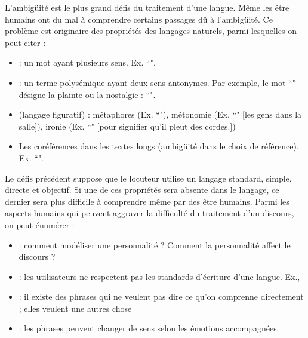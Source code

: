 \documentclass{KodeBook}
\begin{document}
L'ambigüité est le plus grand défis du traitement d'une langue. 
Même les être humains ont du mal à comprendre certains passages dû à l'ambigüité.
Ce problème est originaire des propriétés des langages naturels, parmi lesquelles on peut citer :
\begin{itemize}
	\item {} : un mot ayant plusieurs sens. Ex. ``".
	\item {} : un terme polysémique ayant deux sens antonymes. Par exemple, le mot ``" désigne la plainte ou la nostalgie : ``".
	\item {} (langage figuratif) : métaphores (Ex. ``"), métonomie (Ex. ``" [les gens dans la salle]), ironie (Ex. ``" [pour signifier qu'il pleut des cordes.])
	\item Les coréférences dans les textes longs (ambigüité dans le choix de référence). 
	Ex. ``".
\end{itemize}

Le défis précédent suppose que le locuteur utilise un langage standard, simple, directe et objectif.
Si une de ces propriétés sera absente dans le langage, ce dernier sera plus difficile à comprendre même par des être humains.
Parmi les aspects humains qui peuvent aggraver la difficulté du traitement d'un discours, on peut énumérer :
\begin{itemize}
	\item {} : comment modéliser une personnalité ? Comment la personnalité affect le discours ?
	\item {} : les utilisateurs ne respectent pas les standards d'écriture d'une langue. Ex., 
	\item {} : il existe des phrases qui ne veulent pas dire ce qu'on comprenne directement ; elles veulent une autres chose
	\item {} : les phrases peuvent changer de sens selon les émotions accompagnées
\end{itemize}
\end{document}
